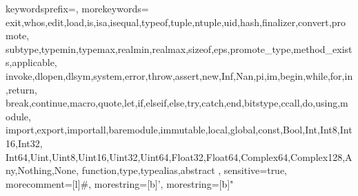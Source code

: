 \usepackage{listings}



{
  keywordsprefix=\@,
  morekeywords={
    exit,whos,edit,load,is,isa,isequal,typeof,tuple,ntuple,uid,hash,finalizer,convert,promote,
    subtype,typemin,typemax,realmin,realmax,sizeof,eps,promote_type,method_exists,applicable,
    invoke,dlopen,dlsym,system,error,throw,assert,new,Inf,Nan,pi,im,begin,while,for,in,return,
    break,continue,macro,quote,let,if,elseif,else,try,catch,end,bitstype,ccall,do,using,module,
    import,export,importall,baremodule,immutable,local,global,const,Bool,Int,Int8,Int16,Int32,
    Int64,Uint,Uint8,Uint16,Uint32,Uint64,Float32,Float64,Complex64,Complex128,Any,Nothing,None,
    function,type,typealias,abstract
  },
  sensitive=true,
  morecomment=[l]{\#},
  morestring=[b]',
  morestring=[b]" 
}


